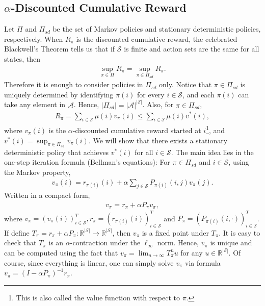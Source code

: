 \documentclass[letterpaper,11pt,openright,openany]{book}
\numberwithin{equation}{section}
\theoremstyle{plain}
\theoremstyle{definition}
\def\R{{\mathbb R}}
\def\R{{\mathbb R}}
\def\S{{\mathcal S}}
\def\A{{\mathcal A}}
\begin{document}
\subsection{$\alpha$-Discounted Cumulative Reward}\label{lalala}
Let $\Pi$ and $\Pi_{sd}$ be the set of Markov policies and stationary deterministic policies, respectively. 
When $R_\pi$ is the discounted cumulative reward, the celebrated Blackwell's Theorem \cite{blackwell1965discounted} tells us that if $\S$ is finite and action sets are the same for all states, then
\begin{align*}
\sup_{\pi\in\Pi}R_\pi=\sup_{\pi\in\Pi_{sd}}R_\pi.
\end{align*}
Therefore it is enough to consider policies in $\Pi_{sd}$ only. 
Notice that $\pi\in\Pi_{sd}$ is uniquely determined by identifying $\pi(i)$ for every $i\in\S$, and each $\pi(i)$ can take any element in $\A$. Hence, $|\Pi_{sd}|=|\A|^{|\S|}$. 
Also, for $\pi\in\Pi_{sd}$,  
\begin{align*}
R_\pi = \sum_{i\in\S}\mu(i) v_\pi(i)\leq\sum_{i\in\S}\mu(i) v^*(i),
\end{align*}
where $v_\pi(i)$ is the $\alpha$-discounted cumulative reward started at $i$\footnote{This is also called the value function with respect to $\pi$.}, and $v^*(i) = \sup_{\pi\in\Pi_{sd}}v_\pi(i)$. We will show that there exists a stationary deterministic policy that achieves $v^*(i)$ for all $i\in\S$. 
The main idea lies in the one-step iteration formula (Bellman's equations): For $\pi\in\Pi_{sd}$ and $i\in\S$, using the Markov property, 
\begin{align}
v_\pi(i) = r_{\pi(i)}(i)+\alpha\sum_{j\in\S}P_{\pi(i)}(i, j)v_{\pi}(j). \label{5:4}
\end{align}
Written in a compact form, 
\begin{align}
v_\pi = r_\pi+\alpha P_{\pi}v_\pi,\label{5:4}
\end{align}
where $v_\pi = (v_\pi(i))^T_{i\in\S}, r_\pi = (r_{\pi(i)}(i))^T_{i\in\S}$ and $P_\pi = (P_{\pi(i)}(i,\cdot))_{i\in\S}^T$. If define $T_\pi = r_\pi+\alpha P_{\pi}: \R^{|\S|}\to\R^{|\S|}$, then $v_\pi$ is a fixed point under $T_\pi$. It is easy to check that $T_\pi$ is an $\alpha$-contraction under the $\ell_\infty$ norm. Hence, $v_\pi$ is unique and can be computed using the fact that $v_\pi = \lim_{n\to\infty}T_\pi^{n}u$ for any $u\in\R^{|\S|}$. Of course, since everything is linear, one can simply solve $v_\pi$ via formula $v_\pi = (I-\alpha P_\pi)^{-1}r_\pi$. 
\end{document}
